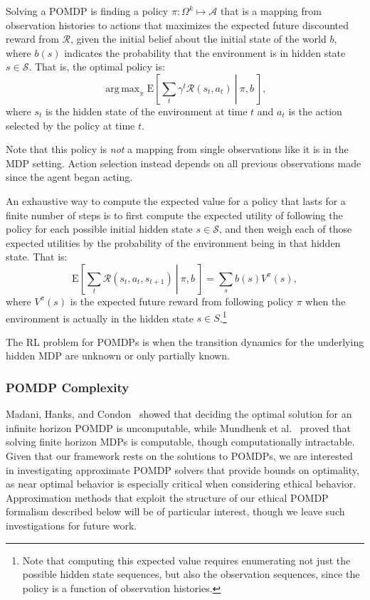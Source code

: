 \documentclass[11pt]{article}
\DeclareMathOperator*{\argmax}{arg\,max}
\begin{document}
Solving a POMDP is finding a policy $\pi : \Omega^k \mapsto \mathcal{A}$ that is a mapping from observation histories to actions that maximizes the expected future discounted reward from $\mathcal{R}$, given the initial belief about the initial state of the world $b$, where $b(s)$ indicates the probability that the environment is in hidden state $s \in \mathcal{S}$. That is, the optimal policy is:
\begin{equation}
\argmax_\pi \left.\text{E}\left[\sum_t \gamma^t \mathcal{R}(s_t,a_t)\ \right|\ \pi, b\ \right],
\end{equation}
where $s_t$ is the hidden state of the environment at time $t$ and $a_t$ is the action selected by the policy at time $t$. 

Note that this policy is {\em not} a mapping from single observations like it is in the MDP setting. Action selection instead depends on all previous observations made since the agent began acting.

An exhaustive way to compute the expected value for a policy that lasts for a finite number of steps is to first compute the expected utility of following the policy for each possible initial hidden state $s \in \mathcal{S}$, and then weigh each of those expected utilities by the probability of the environment being in that hidden state. That is:
\begin{equation}
\left.\text{E}\left[\sum_t \mathcal{R}(s_t,a_t,s_{t+1})\ \right|\ \pi, b\ \right] = \sum_s b(s) V^\pi(s),
\end{equation}
where $V^\pi(s)$ is the expected future reward from following policy $\pi$ when the environment is actually in the hidden state $s \in S$.\footnote{Note that computing this expected value requires enumerating not just the possible hidden state sequences, but also the observation sequences, since the policy is a function of observation histories.}

The RL problem for POMDPs is when the transition dynamics for the underlying hidden MDP are unknown or only partially known.

\subsubsection{POMDP Complexity}
Madani, Hanks, and Condon~ showed that deciding the optimal solution for an infinite horizon POMDP is uncomputable, while Mundhenk et al.~ proved that solving finite horizon MDPs is computable, though computationally intractable. Given that our framework rests on the solutions to POMDPs, we are interested in investigating approximate POMDP solvers that provide bounds on optimality, as near optimal behavior is especially critical when considering ethical behavior. Approximation methods that exploit the structure of our ethical POMDP formalism described below will be of particular interest, though we leave such investigations for future work.
\end{document}
